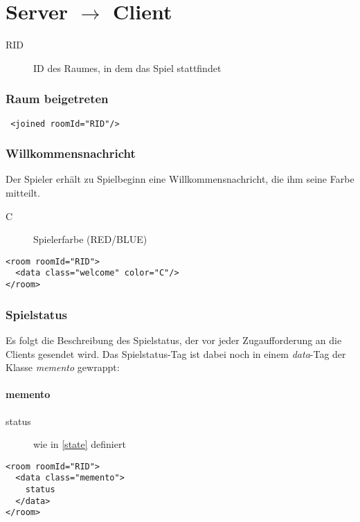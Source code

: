 \documentclass[12pt,a4paper, ngerman, oneside]{scrartcl}
\begin{document}
\newpage
\part{Server $\rightarrow$ Client}
\begin{description}
\item[RID] ID des Raumes, in dem das Spiel stattfindet
\end{description}

\section{Raum beigetreten}
 \begin{verbatim}
 <joined roomId="RID"/>
 \end{verbatim}

\section{Willkommensnachricht}
Der Spieler erhält zu Spielbeginn eine Willkommensnachricht, die ihm seine Farbe mitteilt.
\begin{description}
\item[C] Spielerfarbe (RED/BLUE)
\end{description}
\begin{verbatim}
<room roomId="RID">
  <data class="welcome" color="C"/>
</room>
\end{verbatim}

\section{Spielstatus}
Es folgt die Beschreibung des Spielstatus, der vor jeder Zugaufforderung an die Clients gesendet wird. Das Spielstatus-Tag ist dabei noch in einem \textit{data}-Tag der Klasse \textit{memento} gewrappt:
\subsection{memento}
\begin{description}
\item[status] wie in \ref{state} definiert
\end{description}
\begin{verbatim}
<room roomId="RID"> 
  <data class="memento"> 
  	status
  </data> 
</room>
\end{verbatim}
\end{document}
